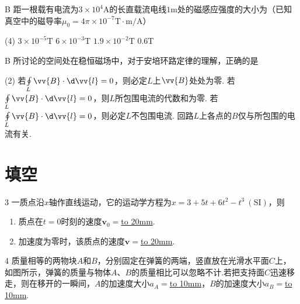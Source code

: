\begin{choice}{B}{}
距一根载有电流为$3\times 10^4\mathrm{A}$的长直载流电线$1\mathrm{m}$处的磁感应强度的大小为（已知真空中的磁导率$\mu_0=4\pi\times 10^{-7}\mathrm{T\cdot m/A}$）
\begin{tasks}(4)
    \task $3\times 10^{-5}\mathrm{T}$
    \task $6\times 10^{-3}\mathrm{T}$
    \task $1.9\times 10^{-2}\mathrm{T}$
    \task $0.6\mathrm{T}$
\end{tasks}
\end{choice}
\begin{choice}{B}{}
所讨论的空间处在稳恒磁场中，对于安培环路定律的理解，正确的是
\begin{tasks}(2)
    \task 若$\oint\limits_L\vv{B}\cdot\d\vv{l}=0$，则必定$L$上$\vv{B}$处处为零.
    \task 若$\oint\limits_L\vv{B}\cdot\d\vv{l}=0$，则$L$所包围电流的代数和为零.
    \task 若$\oint\limits_L\vv{B}\cdot\d\vv{l}=0$，则必定$L$不包围电流.
    \task 回路$L$上各点的$B$仅与所包围的电流有关.
\end{tasks}
\end{choice}
\section{填空}
\begin{exercise}{3}{}
    一质点沿$x$轴作直线运动，它的运动学方程为$x=3+5t+6t^2-t^3\ \boldsymbol{\mathrm{(SI)}}$，则
    \begin{enumerate}[(1)]
        \item 质点在$t=0$时刻的速度$\boldsymbol{v}_0=$\underline{\hbox to 20mm{}}.
        \item 加速度为零时，该质点的速度$\boldsymbol{v}=$\underline{\hbox to 20mm{}}.
    \end{enumerate}
\end{exercise}

\hspace{-2.16em}
\begin{minipage}{0.67\textwidth}
    \begin{exercise}{4}{}
        质量相等的两物块$A$和$B$，分别固定在弹簧的两端，竖直放在光滑水平面$C$上，如图所示，弹簧的质量与物体$A$、$B$的质量相比可以忽略不计.若把支持面$C$迅速移走，则在移开的一瞬间，$A$的加速度大小$a_A=$\underline{\hbox to 10mm{}}，$B$的加速度大小$a_B=$\underline{\hbox to 10mm{}}.
        \end{exercise}
\end{minipage}
\hfill
\begin{minipage}[c]{0.33\textwidth}
\begin{center}
    \begin{tikzpicture}
    
    \end{tikzpicture}
\end{center}
\end{minipage}

